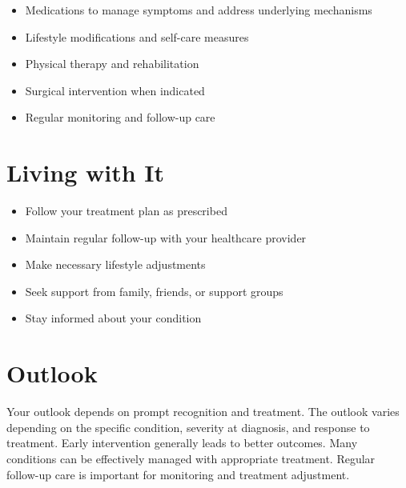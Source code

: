 \begin{itemize}[noitemsep]
  \item Medications to manage symptoms and address underlying mechanisms
  \item Lifestyle modifications and self-care measures
  \item Physical therapy and rehabilitation
  \item Surgical intervention when indicated
  \item Regular monitoring and follow-up care
\end{itemize}
\section{Living with It}
\begin{itemize}[noitemsep]
  \item Follow your treatment plan as prescribed
  \item Maintain regular follow-up with your healthcare provider
  \item Make necessary lifestyle adjustments
  \item Seek support from family, friends, or support groups
  \item Stay informed about your condition
\end{itemize}
\section{Outlook}
Your outlook depends on prompt recognition and treatment. The outlook varies depending on the specific condition, severity at diagnosis, and response to treatment. Early intervention generally leads to better outcomes. Many conditions can be effectively managed with appropriate treatment. Regular follow-up care is important for monitoring and treatment adjustment.
